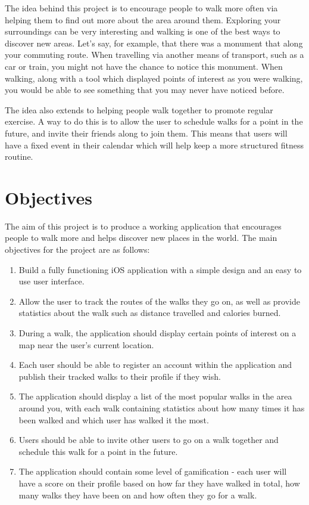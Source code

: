 The idea behind this project is to encourage people to walk more often via helping them to find out more about the area around them. Exploring your surroundings can be very interesting and walking is one of the best ways to discover new areas. Let's say, for example, that there was a monument that along your commuting route. When travelling via another means of transport, such as a car or train, you might not have the chance to notice this monument. When walking, along with a tool which displayed points of interest as you were walking, you would be able to see something that you may never have noticed before.

The idea also extends to helping people walk together to promote regular exercise. A way to do this is to allow the user to schedule walks for a point in the future, and invite their friends along to join them. This means that users will have a fixed event in their calendar which will help keep a more structured fitness routine.


\section{Objectives} \label{section:objectives}

The aim of this project is to produce a working application that encourages people to walk more and helps discover new places in the world. The main objectives for the project are as follows:

\begin{enumerate}[label=\textbf{Obj \arabic*}]
    \item Build a fully functioning iOS application with a simple design and an easy to use user interface.
    \item Allow the user to track the routes of the walks they go on, as well as provide statistics about the walk such as distance travelled and calories burned.
    \item During a walk, the application should display certain points of interest on a map near the user's current location.
    \item Each user should be able to register an account within the application and publish their tracked walks to their profile if they wish.
    \item The application should display a list of the most popular walks in the area around you, with each walk containing statistics about how many times it has been walked and which user has walked it the most.
    \item Users should be able to invite other users to go on a walk together and schedule this walk for a point in the future.
    \item The application should contain some level of gamification - each user will have a score on their profile based on how far they have walked in total, how many walks they have been on and how often they go for a walk.
\end{enumerate}






